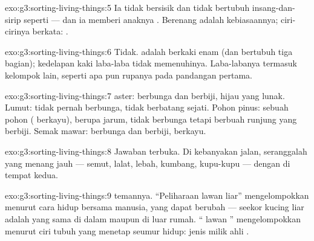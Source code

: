 \begin{solution}{exo:g3:sorting-living-things:5}
Ia tidak bersisik dan tidak bertubuh insang-dan-sirip seperti  ---
dan ia memberi anaknya . Berenang adalah kebiasaannya;
ciri-cirinya berkata: .
\end{solution}

\begin{solution}{exo:g3:sorting-living-things:6}
Tidak.   adalah berkaki enam (dan bertubuh tiga
bagian); kedelapan kaki laba-laba tidak memenuhinya. Laba-labanya
termasuk kelompok lain, seperti apa pun rupanya pada pandangan
pertama.
\end{solution}

\begin{solution}{exo:g3:sorting-living-things:7}
 aster: berbunga dan berbiji,  hijau yang lunak. Lumut:
tidak pernah berbunga, tidak berbatang sejati. Pohon pinus: sebuah
pohon ( berkayu),  berupa jarum, tidak berbunga tetapi
berbuah runjung yang berbiji. Semak mawar: berbunga dan berbiji,
 berkayu.
\end{solution}

\begin{solution}{exo:g3:sorting-living-things:8}
Jawaban terbuka. Di kebanyakan jalan, seranggalah yang menang jauh ---
semut, lalat, lebah, kumbang, kupu-kupu --- dengan  di tempat
kedua.
\end{solution}

\begin{solution}{exo:g3:sorting-living-things:9}
 temannya. ``Peliharaan lawan liar'' mengelompokkan
menurut cara  hidup bersama manusia, yang dapat berubah ---
seekor kucing liar adalah  yang sama di dalam maupun di luar
rumah. `` lawan '' mengelompokkan menurut ciri tubuh yang
menetap seumur hidup: jenis  milik ahli .
\end{solution}

